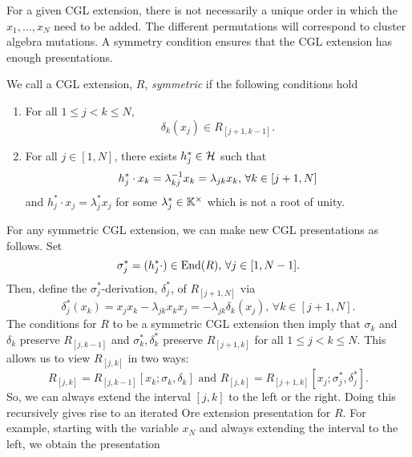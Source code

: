 \documentclass{article}
\begin{document}
For a given CGL extension, there is not necessarily a unique order in which the $x_1,
	\dots, x_N$ need to be added. The different permutations will correspond to cluster
algebra mutations. A symmetry condition ensures that the CGL extension has enough
presentations.

\begin{definition}
	We call a CGL extension, $R$, \emph{symmetric} if the following conditions hold
	\begin{enumerate}
		\item For all $1\leq j < k \leq N$,
		      \begin{equation*}
			      \delta_k (x_j) \in R_{[j+1, k-1]}.
		      \end{equation*}
		\item For all $j \in [1, N]$, there exists $h^*_j \in \mathcal{H}$ such that
		      \begin{equation*}
			      h^*_j \cdot x_k = \lambda_{kj}^{-1} x_k = \lambda_{jk}x_k, \, \forall k \in [j+1, N]
		      \end{equation*}
		      and $h^*_j \cdot x_j = \lambda^*_j x_j$ for some $\lambda_j^*\in \mathbb{K}^\times$ which is not a root of unity.
	\end{enumerate}
\end{definition}
For any symmetric CGL extension, we can make new CGL presentations as follows. Set
\begin{equation*}
	\sigma_j^* = (h_j^* \cdot) \in \operatorname{End}(R),\, \forall j \in [1, N-1].
\end{equation*}
Then, define the $\sigma_j^*$-derivation, $\delta_j^*$, of $R_[j+1, N]$ via
\begin{equation*}
	\delta_j^*(x_k) = x_j x_k - \lambda_{jk}x_kx_j = -\lambda_{jk} \delta_k (x_j), \, \forall k \in [j+1, N].
\end{equation*}
%
The conditions for $R$ to be a symmetric CGL extension then imply that $\sigma_k$ and
$\delta_k$ preserve $R_{[j, k-1]}$ and $\sigma_k^*, \delta_k^*$ preserve $R_{[j+1, k]}$
for all $1 \leq j < k \leq N$. This allows us to view $R_{[j, k]}$ in two ways:
\begin{equation*}
	R_{[j, k]} = R_{[j, k-1]}[x_k; \sigma_k, \delta_k] \text{ and } R_{[j,k]} = R_{[j+1, k]}[x_j; \sigma_j^*, \delta_j^*].
\end{equation*}
So, we can always extend the interval $[j, k]$ to the left or the right. Doing this recursively gives rise to an iterated Ore extension presentation for $R$. For example, starting with the variable $x_N$ and always extending the interval to the left, we obtain the presentation
\end{document}
